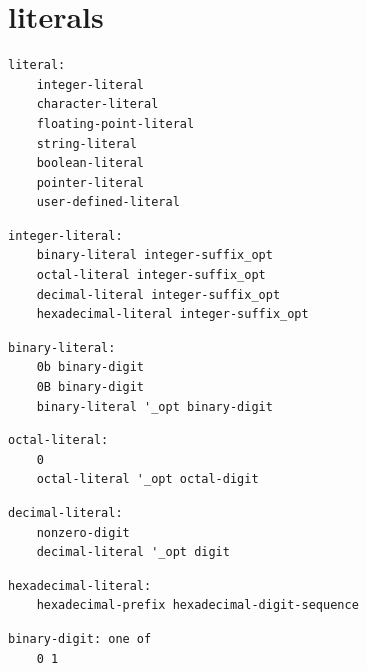 \section{literals}

\noindent\textbf{\texttt{}}\par
\begin{lstlisting}
literal:
    integer-literal
    character-literal
    floating-point-literal
    string-literal
    boolean-literal
    pointer-literal
    user-defined-literal
\end{lstlisting}

\noindent\textbf{\texttt{}}\par
\begin{lstlisting}
integer-literal:
    binary-literal integer-suffix_opt
    octal-literal integer-suffix_opt
    decimal-literal integer-suffix_opt
    hexadecimal-literal integer-suffix_opt
\end{lstlisting}

\noindent\textbf{\texttt{}}\par
\begin{lstlisting}
binary-literal:
    0b binary-digit
    0B binary-digit
    binary-literal '_opt binary-digit
\end{lstlisting}

\noindent\textbf{\texttt{}}\par
\begin{lstlisting}
octal-literal:
    0
    octal-literal '_opt octal-digit
\end{lstlisting}

\noindent\textbf{\texttt{}}\par
\begin{lstlisting}
decimal-literal:
    nonzero-digit
    decimal-literal '_opt digit
\end{lstlisting}

\noindent\textbf{\texttt{}}\par
\begin{lstlisting}
hexadecimal-literal:
    hexadecimal-prefix hexadecimal-digit-sequence
\end{lstlisting}

\noindent\textbf{\texttt{}}\par
\begin{lstlisting}
binary-digit: one of
    0 1
\end{lstlisting}

